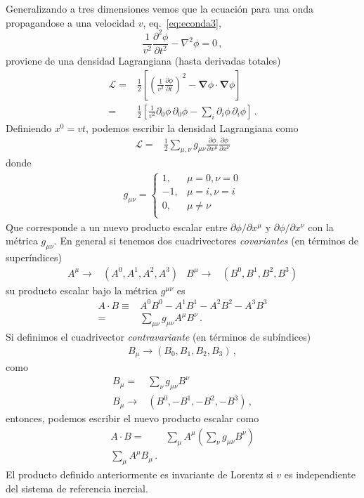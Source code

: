Generalizando a tres dimensiones vemos que la ecuaci\'on para una onda propagandose a una velocidad $v$, eq.~\eqref{eq:econda3},  
\begin{equation}
     \frac{1}{v^2}\frac{\partial^2\phi}{\partial t^2}-\nabla^2\phi=0\,,
\end{equation}
proviene de una densidad Lagrangiana (hasta derivadas totales)
\begin{align}
    \label{eq:ls3d}
    \mathcal{L}=&\frac{1}{2}\left[
  \left(
\frac{1}{v^2}\frac{\partial\phi}{\partial t}
  \right)^2-\boldsymbol{\nabla}\phi\cdot\boldsymbol{\nabla}\phi \right]\nonumber\\
    =&\frac{1}{2}\left[
      \frac{1}{v^2}{\partial_0\phi}\,{\partial_0\phi}-\sum_i{\partial_i\phi}\,{\partial_i\phi}
   \right]\,.
\end{align}
Definiendo $x^0=vt$, podemos escribir la densidad Lagrangiana como
\begin{align}
   \mathcal{L}=&\frac{1}{2}\sum_{\mu,\nu}g_{\mu\nu}\frac{\partial\phi}{\partial x^{\mu}}\frac{\partial\phi}{\partial x^{\nu}}
\end{align}
donde
\begin{align}
  g_{\mu\nu}=
  \begin{cases}
    1, & \mu=0,\nu=0\\
    -1, & \mu=i,\nu=i\\
    0, & \mu\ne\nu\\
  \end{cases}
\end{align}
Que corresponde a un nuevo producto escalar entre $\partial\phi/\partial x^{\mu}$ y $\partial\phi/\partial x^{\nu}$ con la métrica $g_{\mu\nu}$. En general si tenemos dos cuadrivectores \emph{covariantes} (en términos de superíndices)
\begin{align}
\label{eq:covariante}
  A^{\mu}\to &\left(A^0,A^1,A^2,A^3  \right) & B^{\mu}\to &\left(B^0,B^1,B^2,B^3  \right)
\end{align}
su producto escalar bajo la métrica $g^{\mu\nu}$ es
\begin{align}
  A\cdot B\equiv &A^0 B^0-A^1B^1-A^2B^2-A^3B^3 \nonumber\\
 =&\sum_{\mu\nu} g_{\mu\nu}A^{\mu} B^{\nu}\,.
\end{align}
Si definimos el cuadrivector \emph{contravariante} (en términos de subíndices)
\begin{align}
  B_{\mu}\to \left( B_0,B_1,B_2,B_3 \right)\,,
\end{align}
como
\begin{align}
  \label{eq:contravariante}
  B_{\mu}=&\sum_{\nu} g_{\mu\nu}B^{\nu}\nonumber\\
  B_{\mu}\to& \left(B^0,-B^1,-B^2,-B^3\right)\,,
\end{align}
entonces, podemos escribir el nuevo producto escalar como
\begin{align}
  A\cdot B=&\sum_{\mu} A^{\mu}\left( \sum_{\nu} g_{\mu\nu} B^{\nu} \right)\nonumber\\
\sum_{\mu} A^{\mu}B_{\mu}\,.
\end{align}
El producto definido anteriormente es invariante de Lorentz si $v$ es independiente del sistema de referencia inercial.
 



